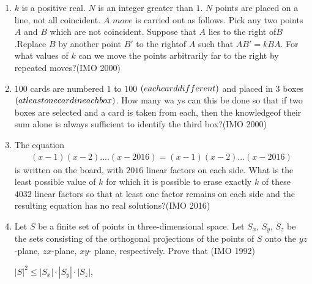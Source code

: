 \begin{enumerate}
\item $k$ is a positive real. $N$ is an integer greater than $1$. $N$ points are placed on a line, not all coincident. $A$ $move$ is carried out as follows. Pick any two points $A$ and $B$ which are not coincident. Suppose that $A$ lies to the right of$B$.Replace $B$ by another point $B'$ to the rightof $A$ such that $AB' = kBA$. For what values of $k$ can we move the points arbitrarily far to the right by repeated moves?\hfill(IMO 2000) 

\item $100$ cards are numbered $1$ to $100$ $\left(each card different\right)$ and placed in $3$ boxes $\left(at least one card in each box\right)$. How many wa ys can this be done so that if two boxes are selected and a card is taken from each, then the knowledgeof their sum alone is always sufficient to identify the third box?\hfill(IMO 2000)                       
\item The equation \begin{align}(x - 1)(x - 2)....(x-2016)=(x-1)(x-2)...(x-2016)\end{align} is written on the board, with $2016$ linear factors on each side. What is the least possible value of $k$ for which it is possible to erase exactly $k$ of these $4032$ linear factors so that at least one factor remains on each side and the resulting equation has no real solutions?\hfill (IMO 2016)
 \item Let $S$ be a finite set of points in three-dimensional space. Let $S_x$, $S_y$, $S_z$ be the sets consisting of the orthogonal projections of the points of $S$ onto the $yz$-plane, $zx$-plane, $xy$- plane, respectively. Prove that    \hfill(IMO 1992)
 
$|S|^{2} \leq |S_x| \cdot |S_y| \cdot |S_z|$,
 


\end{enumerate}
